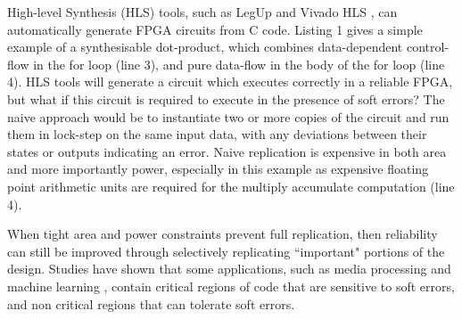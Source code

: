 \providecommand*{\lstnumberautorefname}{line}

High-level Synthesis (HLS) tools, such as LegUp \cite{canis2011legup} and Vivado HLS \cite{feist2012vivado},
can automatically generate FPGA circuits from C code.
Listing 1 gives a simple example of a synthesisable dot-product, which combines
data-dependent control-flow in the for loop (line 3), and pure data-flow
in the body of the for loop (line 4).
HLS tools will generate a circuit which executes correctly in a reliable FPGA, but what if
this circuit is required to execute in the presence of soft errors?
The naive approach would be to instantiate two or more copies of the circuit and run
them in lock-step on the same input data, with any deviations between their states or outputs
indicating an error.
Naive replication is expensive in both area and more importantly
power, especially in this example as expensive floating point arithmetic
units are required for the multiply accumulate computation (line 4).


When tight area and power constraints prevent full replication, then reliability can still be
improved through selectively replicating ``important" portions of the design.
Studies have shown that some applications, such as media processing
\cite{liu2012flikker} and machine learning \cite{wong2006soft}, contain critical regions
of code that are sensitive to soft errors,
and non critical regions that can tolerate soft errors.


